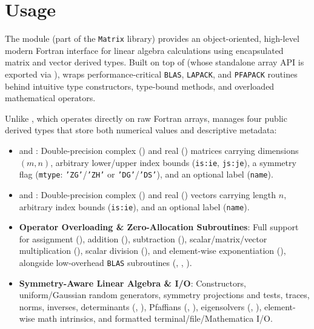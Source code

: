 \section{Usage}
\label{sec:usage}

The  module (part of the \texttt{Matrix} library) provides an object-oriented, high-level modern Fortran interface for linear algebra calculations using encapsulated matrix and vector derived types. Built on top of  (whose standalone array API is exported via ),  wraps performance-critical \texttt{BLAS}, \texttt{LAPACK}, and \texttt{PFAPACK} routines behind intuitive type constructors, type-bound methods, and overloaded mathematical operators.

Unlike , which operates directly on raw Fortran arrays,  manages four public derived types that store both numerical values and descriptive metadata:
\begin{itemize}
  \item {} and : Double-precision complex () and real () matrices carrying dimensions $(m,n)$, arbitrary lower/upper index bounds (\texttt{is:ie}, \texttt{js:je}), a symmetry flag (\texttt{mtype}: \texttt{'ZG'}/\texttt{'ZH'} or \texttt{'DG'}/\texttt{'DS'}), and an optional label (\texttt{name}).
  \item {} and : Double-precision complex () and real () vectors carrying length $n$, arbitrary index bounds (\texttt{is:ie}), and an optional label (\texttt{name}).
  \item \textbf{Operator Overloading \& Zero-Allocation Subroutines}: Full support for assignment (\procname{=}), addition (\procname{+}), subtraction (\procname{-}), scalar/matrix/vector multiplication (\procname{*}), scalar division (\procname{/}), and element-wise exponentiation (\procname{**}), alongside low-overhead \texttt{BLAS} subroutines (, , ).
  \item \textbf{Symmetry-Aware Linear Algebra \& I/O}: Constructors, uniform/Gaussian random generators, symmetry projections and tests, traces, norms, inverses, determinants (, ), Pfaffians (, ), eigensolvers (, ), element-wise math intrinsics, and formatted terminal/file/Mathematica I/O.
\end{itemize}

